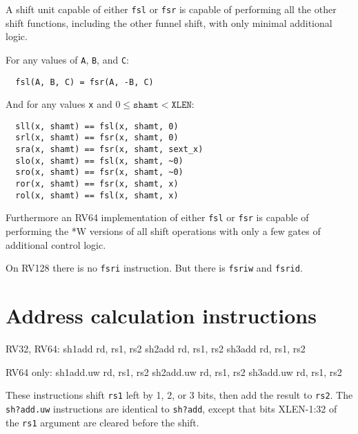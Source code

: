 



A shift unit capable of either {\tt fsl} or {\tt fsr} is capable of performing all
the other shift functions, including the other funnel shift, with only minimal additional
logic.

For any values of {\tt A}, {\tt B}, and {\tt C}:

\begin{minipage}{\linewidth}
\begin{verbatim}
  fsl(A, B, C) = fsr(A, -B, C)
\end{verbatim}
\end{minipage}

And for any values {\tt x} and $0 \le \texttt{shamt} < \texttt{XLEN}$:

\begin{minipage}{\linewidth}
\begin{verbatim}
  sll(x, shamt) == fsl(x, shamt, 0)
  srl(x, shamt) == fsr(x, shamt, 0)
  sra(x, shamt) == fsr(x, shamt, sext_x)
  slo(x, shamt) == fsl(x, shamt, ~0)
  sro(x, shamt) == fsr(x, shamt, ~0)
  ror(x, shamt) == fsr(x, shamt, x)
  rol(x, shamt) == fsl(x, shamt, x)
\end{verbatim}
\end{minipage}

Furthermore an RV64 implementation of either {\tt fsl} or {\tt fsr} is capable
of performing the *W versions of all shift operations with only a few gates
of additional control logic.

On RV128 there is no {\tt fsri} instruction. But there is {\tt fsriw} and {\tt fsrid}.


\section{Address calculation instructions}

\begin{rvb}
  RV32, RV64:
    sh1add rd, rs1, rs2
    sh2add rd, rs1, rs2
    sh3add rd, rs1, rs2

  RV64 only:
    sh1add.uw rd, rs1, rs2
    sh2add.uw rd, rs1, rs2
    sh3add.uw rd, rs1, rs2
\end{rvb}

These instructions shift {\tt rs1} left by 1, 2, or 3 bits, then add the result
to {\tt rs2}. The {\tt sh?add.uw} instructions are identical to {\tt sh?add}, except
that bits XLEN-1:32 of the {\tt rs1} argument are cleared before the shift.

